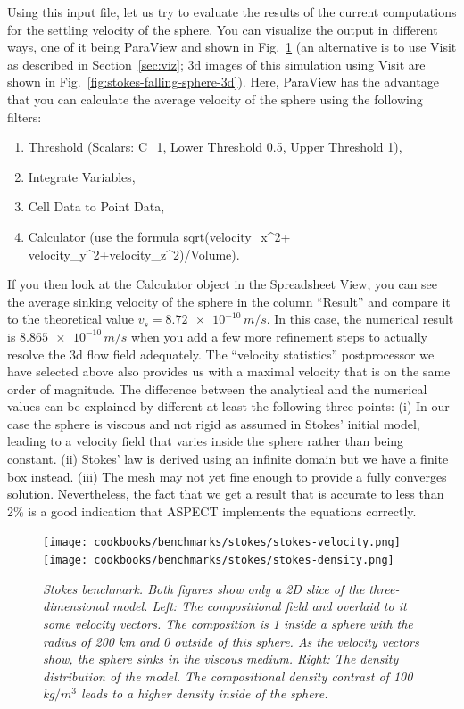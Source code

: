 \documentclass{article}
\newcommand{\aspect}{\textsc{ASPECT}}
\begin{document}
Using this input file, let us try to evaluate the results of the current
computations for the settling velocity of the sphere. You can visualize the output in different
ways, one of it being ParaView and shown in
Fig.~\ref{fig:stokes-falling-sphere-2d} (an alternative is to use Visit as
described in Section~\ref{sec:viz}; 3d images of this simulation using Visit
are shown in Fig.~\ref{fig:stokes-falling-sphere-3d}).
Here, ParaView has the advantage that you can calculate the average velocity
of the sphere using the following filters:
\begin{enumerate}
 \item Threshold (Scalars: C\_1, Lower Threshold 0.5, Upper Threshold 1),
 \item Integrate Variables,
 \item Cell Data to Point Data,
 \item Calculator (use the formula sqrt(velocity\_x\textasciicircum2+
       velocity\_y\textasciicircum2+velocity\_z\textasciicircum2)/Volume).
\end{enumerate}
If you then look at
the Calculator object in the Spreadsheet View, you can see the average sinking
velocity of the sphere in the column ``Result'' and compare it to the theoretical
value $v_s = \num{8.72e-10} \, \si{m}/\si{s}$.
In this case, the numerical result is $\num{8.865e-10} \,
\si{m}/\si{s}$ when you add a few more refinement steps to actually resolve
the 3d flow field adequately. The ``velocity statistics'' postprocessor we have
selected above also provides us with a maximal velocity that is on the same
order of magnitude. The difference between the analytical and the numerical
values can be explained by different at least the following three points:
(i) In our case the sphere is viscous and not rigid as assumed in Stokes' initial model, leading to
a velocity field that varies inside the sphere rather than being constant.
(ii) Stokes' law is derived using an infinite domain but we have a finite box
instead. (iii) The mesh may not yet fine enough to provide a fully converges
solution. Nevertheless, the fact that we get a result that is accurate to less
than 2\% is a good indication that \aspect{} implements the equations correctly.

\begin{figure}
  \begin{center}
    \texttt{[image: cookbooks/benchmarks/stokes/stokes-velocity.png]}
    \hfill
    \texttt{[image: cookbooks/benchmarks/stokes/stokes-density.png]}
  \end{center}
  \caption{\it Stokes benchmark. Both figures show only a 2D slice of the
      three-dimensional model.
      Left: The compositional field and overlaid to it some velocity vectors.
      The composition is 1 inside a sphere with the radius of 200 km and 0
      outside of this sphere. As the velocity vectors show, the sphere sinks
      in the viscous medium.
      Right: The density distribution of the model. The compositional density
      contrast of 100 kg$/\si{m}^3$ leads to a higher density inside of the
      sphere.}
  \label{fig:stokes-falling-sphere-2d}
\end{figure}
\end{document}
